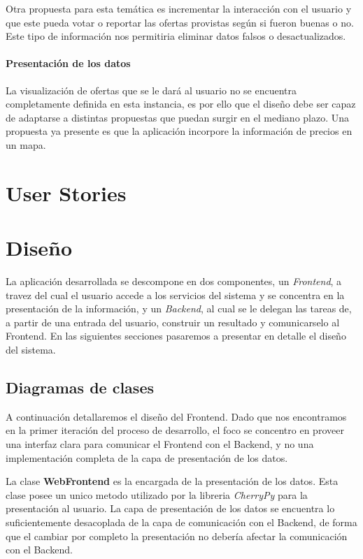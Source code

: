 \documentclass[10pt, a4paper]{article}
\begin{document}
Otra propuesta para esta temática es incrementar la interacción con el usuario y que este pueda votar o reportar las ofertas provistas según si fueron buenas o no. Este tipo de información nos permitiria eliminar datos falsos o desactualizados.

\paragraph{Presentación de los datos}
La visualización de ofertas que se le dará al usuario no se encuentra completamente definida en esta instancia, es por ello que el diseño debe ser capaz de adaptarse a distintas propuestas que puedan surgir en el mediano plazo. Una propuesta ya presente es que la aplicación incorpore la información de precios en un mapa.


\section{User Stories}



\section{Diseño}

La aplicación desarrollada se descompone en dos componentes, un \emph{Frontend}, a travez del cual el usuario accede a los servicios del sistema y se concentra en la presentación de la información, y un \emph{Backend}, al cual se le delegan las tareas de, a partir de una entrada del usuario, construir un resultado y comunicarselo al Frontend. En las siguientes secciones pasaremos a presentar en detalle el diseño del sistema.

\subsection{Diagramas de clases}
  
A continuación detallaremos el diseño del Frontend. Dado que nos encontramos en la primer iteración del proceso de desarrollo, el foco se concentro en proveer una interfaz clara para comunicar el Frontend con el Backend, y no una implementación completa de la capa de presentación de los datos.

La clase \textbf{WebFrontend} es la encargada de la presentación de los datos. Esta clase posee un unico metodo utilizado por la libreria \emph{CherryPy} para la presentación  al usuario. La capa de presentación de los datos se encuentra lo suficientemente desacoplada de la capa de comunicación con el Backend, de forma que el cambiar por completo la presentación no debería afectar la comunicación con el Backend.
\end{document}

